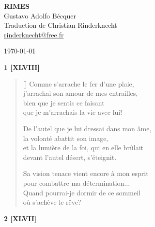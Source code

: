 \documentclass[a4paper,12pt]{book}
\begin{document}
\thispagestyle{empty}
\vspace*{70mm}
\begin{center}
{\Huge\textbf{RIMES}} \\
\vspace*{10mm}
{\Large Gustavo Adolfo Bécquer} \\
\vspace*{10mm}
Traduction de Christian Rinderknecht\\
\url{rinderknecht@free.fr}
\end{center}

\centerline\today

\cleardoublepage

\frenchspacing  %

\newpage


\begin{center}
  \textbf{1 [XLVIII]}
\end{center}

\settowidth{\versewidth}{et la lumière de la foi, qui en elle brûlait}

\begin{verse}[\versewidth]
  Comme s'arrache le fer d'une plaie, \\
  j'arrachai son amour de mes entrailles, \\
  bien que je sentis ce faisant \\
  que je m'arrachais la vie avec lui!

  De l'autel que je lui dressai dans mon âme, \\
  la volonté abattit son image, \\
  et la lumière de la foi, qui en elle brûlait \\
  devant l'autel désert, s'éteignit.

  Sa vision tenace vient encore à mon esprit \\
  pour combattre ma détermination... \\
  Quand pourrai-je dormir de ce sommeil \\
  où s'achève le rêve?
\end{verse}

\bigskip

\begin{center}
  \textbf{2 [XLVII]}
\end{center}
\end{document}

